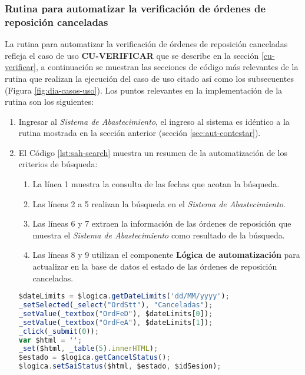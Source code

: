 \subsubsection{Rutina para automatizar la verificación de órdenes de reposición canceladas}
La rutina para automatizar la verificación de órdenes de reposición canceladas refleja el caso de uso \textbf{CU-VERIFICAR} que se describe en la sección \ref{cu-verificar}, a continuación se muestran las secciones de código más relevantes de la rutina que realizan la ejecución del caso de uso citado así como los subsecuentes (Figura \ref{fig:dia-casos-uso}). Los puntos relevantes en la implementación de la rutina son los siguientes:
\begin{enumerate}
	\item Ingresar al \textit{Sistema de Abastecimiento}, el ingreso al sistema es idéntico a la rutina mostrada en la sección anterior (sección \ref{sec:aut-contestar}).

	\item El Código \ref{lst:sah-search} muestra un resumen de la automatización de los criterios de búsqueda:
	\begin{enumerate}
		\item La línea 1 muestra la consulta de las fechas que acotan la búsqueda.
		\item Las líneas 2 a 5 realizan la búsqueda en el \textit{Sistema de Abastecimiento}.
		\item Las líneas 6 y 7 extraen la información de las órdenes de reposición que muestra el \textit{Sistema de Abastecimiento} como resultado de la búsqueda.
		\item Las líneas 8 y 9 utilizan el componente \textbf{Lógica de automatización} para actualizar en la base de datos el estado de las órdenes de reposición canceladas.
	\end{enumerate}
	\begin{lstlisting}[language=Javascript, caption={Responder orden de reposición.}, captionpos=b, label={lst:sah-search}]
$dateLimits = $logica.getDateLimits('dd/MM/yyyy');
_setSelected(_select("OrdStt"), "Canceladas");
_setValue(_textbox("OrdFeD"), $dateLimits[0]);
_setValue(_textbox("OrdFeA"), $dateLimits[1]);
_click(_submit(0));
var $html = '';
_set($html, _table(5).innerHTML);
$estado = $logica.getCancelStatus();
$logica.setSaiStatus($html, $estado, $idSesion);
	\end{lstlisting}
\end{enumerate}
